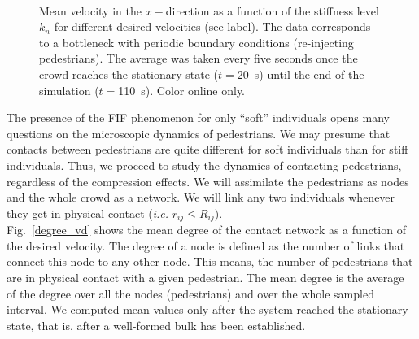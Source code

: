 \documentclass[preprint,12pt]{elsarticle}
\begin{document}
\begin{figure}[!htbp]
\centering
    \\
\caption[width=0.47\columnwidth]{Mean velocity in the $x-$direction as a function 
of the stiffness level $k_n$ for different desired velocities (see label). The 
data corresponds to a bottleneck with periodic boundary conditions (re-injecting 
pedestrians). The average was taken every five seconds once the crowd reaches the 
stationary state ($t=$20~s) until the end of the simulation ($t=$110~s). 
Color online only. }
\label{kn_vs_vx_bottleneck}
\end{figure}


The presence of the FIF phenomenon for only ``soft'' individuals opens many questions 
on the microscopic dynamics of pedestrians. We may presume that contacts 
between pedestrians are quite different for soft individuals than for stiff 
individuals. Thus, we proceed to study the dynamics of contacting pedestrians, regardless of the compression 
effects. We will assimilate the pedestrians as nodes and the whole crowd as a 
network. We will link any two individuals whenever they get in physical 
contact (\textit{i.e.} $r_{ij} \leq R_{ij}$).\\

Fig.~\ref{degree_vd} shows the mean degree of the contact network as a function  
of the desired velocity. The degree of a node is defined as the number of links 
that connect this node to any other node. This means, the number of pedestrians 
that are in physical contact with a given pedestrian. The mean degree is the 
average of the degree over all the nodes (pedestrians) and over the whole 
sampled interval. We computed mean values only after the system reached the stationary 
state, that is, after a well-formed bulk has been established.\\
\end{document}
